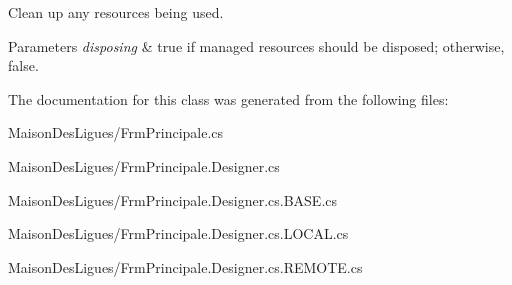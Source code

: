 Clean up any resources being used. 


\begin{DoxyParams}{Parameters}
{\em disposing} & true if managed resources should be disposed; otherwise, false.\\
\hline
\end{DoxyParams}


The documentation for this class was generated from the following files\+:\begin{DoxyCompactItemize}
\item 
Maison\+Des\+Ligues/Frm\+Principale.\+cs\item 
Maison\+Des\+Ligues/Frm\+Principale.\+Designer.\+cs\item 
Maison\+Des\+Ligues/Frm\+Principale.\+Designer.\+cs.\+B\+A\+S\+E.\+cs\item 
Maison\+Des\+Ligues/Frm\+Principale.\+Designer.\+cs.\+L\+O\+C\+A\+L.\+cs\item 
Maison\+Des\+Ligues/Frm\+Principale.\+Designer.\+cs.\+R\+E\+M\+O\+T\+E.\+cs\end{DoxyCompactItemize}
